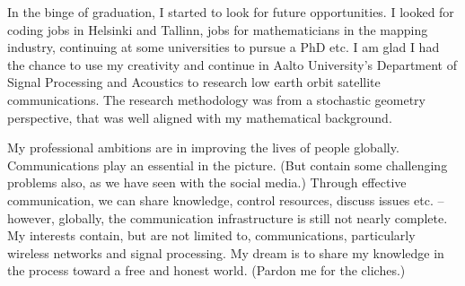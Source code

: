 \documentclass{article}
\begin{document}
{          In the binge of graduation, I started to look for future opportunities. I looked for coding jobs in Helsinki and Tallinn, jobs for mathematicians in the mapping industry, continuing at some universities to pursue a PhD etc. I am glad I had the chance to use my creativity and continue in Aalto University's Department of Signal Processing and Acoustics to research low earth orbit satellite communications. The research methodology was from a stochastic geometry perspective, that was well aligned with my mathematical background.

          My professional ambitions are in improving the lives of people globally. Communications play an essential in the picture. (But contain some challenging problems also, as we have seen with the social media.) Through effective communication, we can share knowledge, control resources, discuss issues etc. -- however, globally, the communication infrastructure is still not nearly complete. My interests contain, but are not limited to, communications, particularly wireless networks and signal processing. My dream is to share my knowledge in the process toward a free and honest world. (Pardon me for the cliches.)
          
        }

\end{document}
